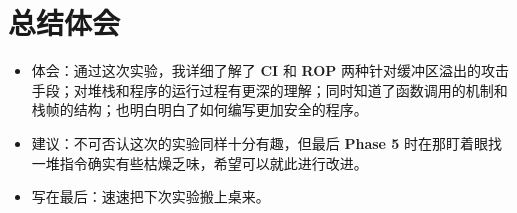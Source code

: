 \section{总结体会}
    \begin{itemize}
        \item 体会：通过这次实验，我详细了解了 \textbf{CI} 和 \textbf{ROP} 两种针对缓冲区溢出的攻击手段；对堆栈和程序的运行过程有更深的理解；同时知道了函数调用的机制和栈帧的结构；也明白明白了如何编写更加安全的程序。
        \item 建议：不可否认这次的实验同样十分有趣，但最后 \textbf{Phase 5} 时在那盯着眼找一堆指令确实有些枯燥乏味，希望可以就此进行改进。
        \item 写在最后：速速把下次实验搬上桌来。
    \end{itemize} 